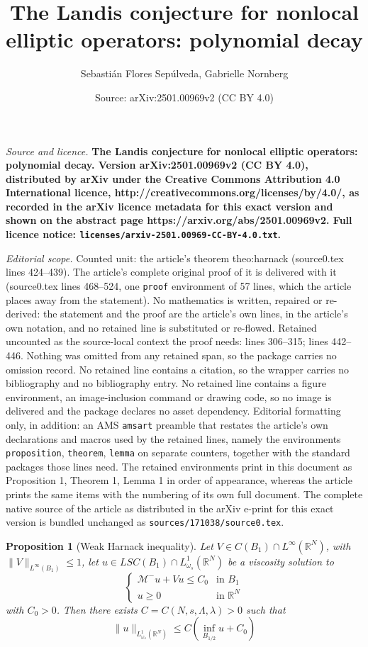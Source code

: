 \documentclass[10pt,a4paper]{amsart}
\title{\bf\Large The Landis conjecture for nonlocal elliptic operators: polynomial decay}
\author{Sebasti\'an Flores Sep\'ulveda, Gabrielle Nornberg}
\date{Source: arXiv:2501.00969v2 (CC BY 4.0)}
\newtheorem{proposition}{Proposition}
\newcommand{\Lomega}{L_{\omega_s}^1(\R^N)}
\newcommand{\M}{\mathcal{M}}
\newcommand{\R}{\mathbb{R}}
\begin{document}
\maketitle

\noindent\emph{Source and licence.} \bf\Large The Landis conjecture for nonlocal elliptic operators: polynomial decay. Version arXiv:2501.00969v2 (CC BY 4.0), distributed by arXiv under the Creative Commons Attribution 4.0 International licence, http://creativecommons.org/licenses/by/4.0/, as recorded in the arXiv licence metadata for this exact version and shown on the abstract page https://arxiv.org/abs/2501.00969v2. Full licence notice: \texttt{licenses/arxiv-2501.00969-CC-BY-4.0.txt}.\par\smallskip

\noindent\textit{Editorial scope.} Counted unit: the article's theorem theo:harnack (source0.tex lines 424--439). The article's complete original proof of it is delivered with it (source0.tex lines 468--524, one \texttt{proof} environment of 57 lines, which the article places away from the statement). No mathematics is written, repaired or re-derived: the statement and the proof are the article's own lines, in the article's own notation, and no retained line is substituted or re-flowed.  Retained uncounted as the source-local context the proof needs: lines 306--315; lines 442--446.  Nothing was omitted from any retained span, so the package carries no omission record.  No retained line contains a citation, so the wrapper carries no bibliography and no bibliography entry.  No retained line contains a figure environment, an image-inclusion command or drawing code, so no image is delivered and the package declares no asset dependency.  Editorial formatting only, in addition: an AMS \texttt{amsart} preamble that restates the article's own declarations and macros used by the retained lines, namely the environments \texttt{proposition}, \texttt{theorem}, \texttt{lemma} on separate counters, together with the standard packages those lines need.  The retained environments print in this document as Proposition 1, Theorem 1, Lemma 1 in order of appearance, whereas the article prints the same items with the numbering of its own full document.  The complete native source of the article as distributed in the arXiv e-print for this exact version is bundled unchanged as \texttt{sources/171038/source0.tex}.
\begin{proposition}[Weak Harnack inequality]
\label{prop:weakharnack}
Let $V \in C(B_1)\cap L^{\infty}(\R^N)$, with $\|V\|_{L^{\infty}(B_1)} \leq 1$, let $u\in LSC(B_1) \cap L^1_{\omega_s}(\R^N)$ be a viscosity solution to 
\[\begin{cases}
\M^-u + Vu \leq C_0 & \text{in }B_1\\
u\geq 0 & \text{in } \R^N
\end{cases}\]
with $C_0 > 0$. Then there exists $C=C(N,s,\Lambda, \lambda)>0$ such that
\[\|u\|_{\Lomega}\leq C(\inf_{B_{1/2}}u + C_{0}) \]
\end{proposition}
\end{document}
